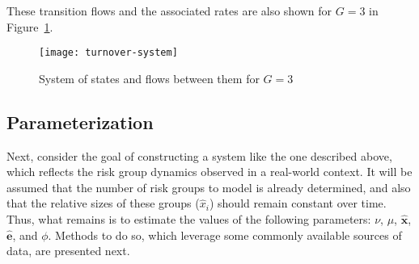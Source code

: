These transition flows and the associated rates
are also shown for $G = 3$ in Figure~\ref{fig:system}.
\begin{figure}
  \centering
  \texttt{[image: turnover-system]}
  \caption{System of states and flows between them for $G = 3$}
  \label{fig:system}
\end{figure}
\subsection{Parameterization}\label{ss:params}
Next, consider the goal of constructing a system like the one described above,
which reflects the risk group dynamics observed in a real-world context.
It will be assumed that the number of risk groups to model is already determined,
and also that the relative sizes of these groups ($\hat{x}_i$) should remain constant over time.
Thus, what remains is to estimate the values of the following parameters:
$\nu$, $\mu$, $\bm{\hat{x}}$, $\bm{\hat{e}}$, and $\phi$.
Methods to do so, which leverage some commonly available sources of data,
are presented next.
